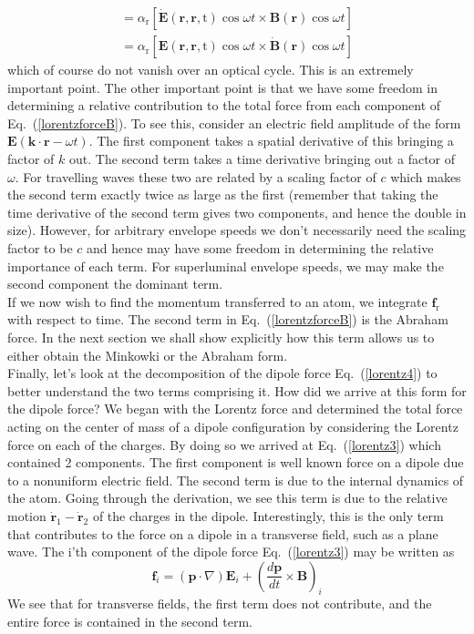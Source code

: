 \documentclass[twocolumn,english,pra,aps,superscriptaddress,floatfix]{revtex4-1}
\begin{document}
\begin{align}
&=\alpha_{\mathrm{r}}\left[\dot{\mathbf{E}}(\mathbf{r},\mathbf{r},\mathrm{t})\cos{\omega t}\times\mathbf{B}(\mathbf{r})\cos{\omega t}\right]& \nonumber \\
&=\alpha_{\mathrm{r}}\left[\mathbf{E}(\mathbf{r},\mathbf{r},\mathrm{t})\cos{\omega t}\times\dot{\mathbf{B}}(\mathbf{r})\cos{\omega t}\right]&
\label{lorentzforceD}
\end{align}
which of course do not vanish over an optical cycle. This is an extremely important point.  The other important point is that we have some freedom in determining a relative contribution to the total force from each component of Eq.\ (\ref{lorentzforceB}).  To see this, consider an electric field amplitude of the form $\mathbf{E}(\mathbf{k}\cdot\mathbf{r}-\omega t)$.  The first component takes a spatial derivative of this bringing a factor of $k$ out.  The second term takes a time derivative bringing out a factor of $\omega$.  For travelling waves these two are related by a scaling factor of $c$ which makes the second term exactly twice as large as the first (remember that taking the time derivative of the second term gives two components, and hence the double in size). However, for arbitrary envelope speeds we don't necessarily need the scaling factor to be $c$ and hence may have some freedom in determining the relative importance of each term. For superluminal envelope speeds, we may make the second component the dominant term. \\
If we now wish to find the momentum transferred to an atom, we integrate $\mathbf{f}_{\mathrm{r}}$ with respect to time.  The second term in Eq.\ (\ref{lorentzforceB}) is the Abraham force. In the next section we shall show explicitly how this term allows us to either obtain the Minkowki or the Abraham form.  \\
Finally, let's look at the decomposition of the dipole force Eq.\ (\ref{lorentz4}) to better understand the two terms comprising it.  How did we arrive at this form for the dipole force?  We began with the Lorentz force and determined the total force acting on the center of mass of a dipole configuration by considering the Lorentz force on each of the charges. By doing so we arrived at Eq.\ (\ref{lorentz3}) which contained 2 components.  The first component is well known force on a dipole due to a nonuniform electric field.  The second term is due to the internal dynamics of the atom.  Going through the derivation, we see this term is due to the relative motion $\dot{\mathbf{r}}_1-\dot{\mathbf{r}}_2$ of the charges in the dipole. Interestingly, this is the only term that contributes to the force on a dipole in a transverse field, such as a plane wave. The i'th component of the dipole force Eq.\ (\ref{lorentz3}) may be written as
\begin{equation}
\mathbf{f}_i =\left(\mathbf{p}\cdot\nabla\right)\mathbf{E}_i+\left(\frac{d\mathbf{p}}{dt}\times\mathbf{B}\right)_i
\label{lorentz6}
\end{equation}
We see that for transverse fields, the first term does not contribute, and the entire force is contained in the second term. 
\end{document}
